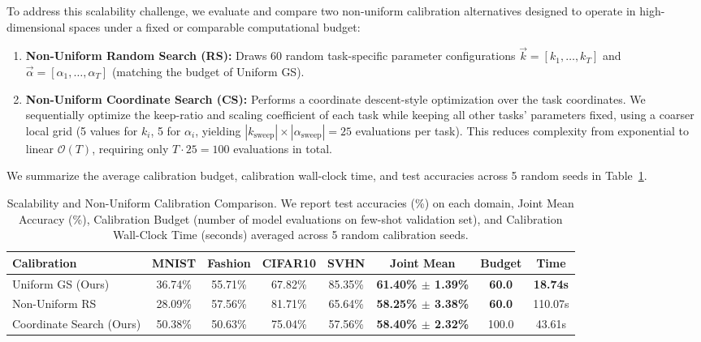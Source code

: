 To address this scalability challenge, we evaluate and compare two non-uniform calibration alternatives designed to operate in high-dimensional spaces under a fixed or comparable computational budget:
\begin{enumerate}
    \item \textbf{Non-Uniform Random Search (RS):} Draws 60 random task-specific parameter configurations $\vec{k} = [k_1, \dots, k_T]$ and $\vec{\alpha} = [\alpha_1, \dots, \alpha_T]$ (matching the budget of Uniform GS).
    \item \textbf{Non-Uniform Coordinate Search (CS):} Performs a coordinate descent-style optimization over the task coordinates. We sequentially optimize the keep-ratio and scaling coefficient of each task while keeping all other tasks' parameters fixed, using a coarser local grid (5 values for $k_i$, 5 for $\alpha_i$, yielding $|k_{\text{sweep}}| \times |\alpha_{\text{sweep}}| = 25$ evaluations per task). This reduces complexity from exponential to linear $\mathcal{O}(T)$, requiring only $T \cdot 25 = 100$ evaluations in total.
\end{enumerate}

We summarize the average calibration budget, calibration wall-clock time, and test accuracies across 5 random seeds in Table~\ref{tab:scalability_results}.

\begin{table}[ht]
\caption{Scalability and Non-Uniform Calibration Comparison. We report test accuracies (\%) on each domain, Joint Mean Accuracy (\%), Calibration Budget (number of model evaluations on few-shot validation set), and Calibration Wall-Clock Time (seconds) averaged across 5 random calibration seeds.}
\label{tab:scalability_results}
\vskip 0.15in
\begin{center}
\begin{footnotesize}
\begin{sc}
\setlength{\tabcolsep}{1.5pt}
\begin{tabular}{lccccccc}
\toprule
Calibration & MNIST & Fashion & CIFAR10 & SVHN & Joint Mean & Budget & Time \\
\midrule
Uniform GS (Ours) & 36.74\% & 55.71\% & 67.82\% & 85.35\% & \textbf{61.40\% $\pm$ 1.39\%} & \textbf{60.0} & \textbf{18.74s} \\
Non-Uniform RS  & 28.09\% & 57.56\% & 81.71\% & 65.64\% & \textbf{58.25\% $\pm$ 3.38\%} & \textbf{60.0} & 110.07s \\
Coordinate Search (Ours) & 50.38\% & 50.63\% & 75.04\% & 57.56\% & \textbf{58.40\% $\pm$ 2.32\%} & 100.0 & 43.61s \\
\bottomrule
\end{tabular}
\end{sc}
\end{footnotesize}
\end{center}
\vskip -0.1in
\end{table}

